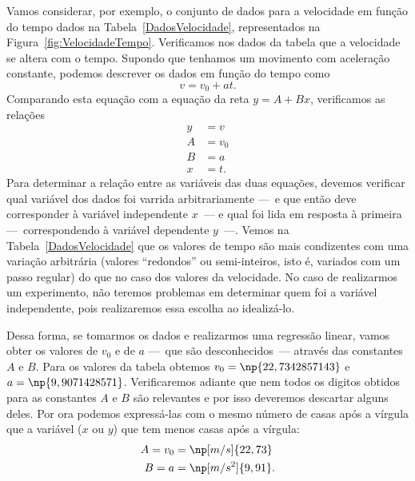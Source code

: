 Vamos considerar, por exemplo, o conjunto de dados para a velocidade em função do tempo dados na Tabela~\ref{DadosVelocidade}, representados na Figura~\ref{fig:VelocidadeTempo}. Verificamos nos dados da tabela que a velocidade se altera com o tempo. Supondo que tenhamos um movimento com aceleração constante, podemos descrever os dados em função do tempo como
\begin{equation}
	v = v_0 + at.
\end{equation}
%
Comparando esta equação com a equação da reta $y = A + Bx$, verificamos as relações
\begin{align}
	y &= v \\
	A &= v_0 \\
	B &= a \\
	x &= t.
\end{align}
%
Para determinar a relação entre as variáveis das duas equações, devemos verificar qual variável dos dados foi varrida arbitrariamente ---~e que então deve corresponder à variável independente $x$~--- e qual foi lida em resposta à primeira ---~correspondendo à variável dependente $y$~---. Vemos na Tabela~\ref{DadosVelocidade} que os valores de tempo são mais condizentes com uma variação arbitrária (valores ``redondos'' ou semi-inteiros, isto é, variados com um passo regular) do que no caso dos valores da velocidade. No caso de realizarmos um experimento, não teremos problemas em determinar quem foi a variável independente, pois realizaremos essa escolha ao idealizá-lo.

Dessa forma, se tomarmos os dados e realizarmos uma regressão linear, vamos obter os valores de $v_0$ e de $a$ ---~que são desconhecidos~--- através das constantes $A$ e $B$. Para os valores da tabela obtemos $v_0 = \np{22,734 285 714 3}$ e $a = \np{9,907 142 857 1}$. Verificaremos adiante que nem todos os digitos obtidos para as constantes $A$ e $B$ são relevantes e por isso deveremos descartar alguns deles. Por ora podemos expressá-las com o mesmo número de casas após a vírgula que a variável ($x$ ou $y$) que tem menos casas após a vírgula:
\begin{align}
	A = v_0 &= \np[m/s]{22,73} \\
	B = a &= \np[m/s^2]{9,91}.
\end{align}

\begin{figure*}[t]
\centering
\caption{Gráfico dos dados da Tabela~\ref{DadosVelocidade}.} 
\label{fig:VelocidadeTempo}

\end{figure*}



